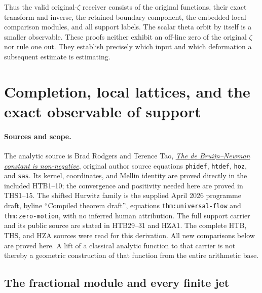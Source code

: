 \documentclass[11pt]{article}
\theoremstyle{definition}
\begin{document}
Thus the valid original-$\zeta$ receiver consists of the original
functions, their exact transform and inverse, the retained boundary
component, the embedded local comparison modules, and all support
labels. The scalar theta orbit by itself is a smaller observable.
These proofs neither exhibit an off-line zero of the original
$\zeta$ nor rule one out. They establish precisely which input and
which deformation a subsequent estimate is estimating.

\clearpage

\section{Completion, local lattices, and the exact observable of support}
\label{sec:completion-faithfulness-independent}

\paragraph{Sources and scope.}
The analytic source is Brad Rodgers and Terence Tao,
\href{https://arxiv.org/abs/1801.05914v5}{\emph{The de Bruijn--Newman constant is non-negative}},
original author source equations \texttt{phidef}, \texttt{htdef},
\texttt{hoz}, and \texttt{sas}. Its kernel, coordinates, and Mellin
identity are proved directly in the included HTB1--10; the convergence
and positivity needed here are proved in THS1--15. The shifted Hurwitz
family is the supplied April 2026 programme draft, byline ``Compiled
theorem draft'', equations \texttt{thm:universal-flow} and
\texttt{thm:zero-motion}, with no inferred human attribution.
The full support carrier and its public source are stated in HTB29--31
and HZA1. The complete HTB, THS, and HZA sources were read for this
derivation. All new comparisons below are proved here. A lift of a
classical analytic function to that carrier is not thereby a geometric
construction of that function from the entire arithmetic base.

\subsection{The fractional module and every finite jet}
\end{document}
